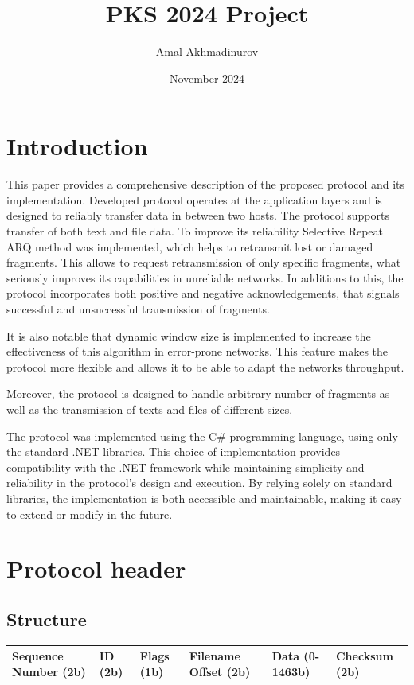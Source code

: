 \documentclass{article}
\title{PKS 2024 Project}
\author{Amal Akhmadinurov}
\date{November 2024}
\begin{document}
\maketitle
\tableofcontents
\newpage
\section{Introduction}


This paper provides a comprehensive description of the proposed protocol and its implementation.
Developed protocol operates at the application layers and is designed to reliably transfer data in between two hosts. The protocol supports transfer of both text and file data. To improve its reliability Selective Repeat ARQ method was implemented, which helps to retransmit lost or damaged fragments. This allows to request retransmission of only specific fragments, what seriously improves its capabilities in unreliable networks. In additions to this, the protocol incorporates both positive and negative acknowledgements, that signals successful and unsuccessful transmission of fragments. 

It is also notable that dynamic window size is implemented to increase the effectiveness of this algorithm in error-prone networks. This feature makes the protocol more flexible and allows it to be able to adapt the networks throughput.

Moreover, the protocol is designed to handle arbitrary number of fragments as well as the transmission of texts and files of different sizes.

The protocol was implemented using the C\# programming language, using only the standard .NET libraries. This choice of implementation provides compatibility with the .NET framework while maintaining simplicity and reliability in the protocol's design and execution. By relying solely on standard libraries, the implementation is both accessible and maintainable, making it easy to extend or modify in the future.



\newpage
\section{Protocol header}

\subsection{Structure}

\begin{tabular}{|p{2cm}|p{1cm}|p{1cm}|p{2cm}|p{3cm}|p{2cm}|}
\hline
Sequence Number (2b) & 
ID (2b) & 
Flags  (1b)& 
Filename Offset (2b) &
Data (0-1463b) &
Checksum (2b)

\\
\hline




\end{tabular}
\newline
\newline
\end{document}
